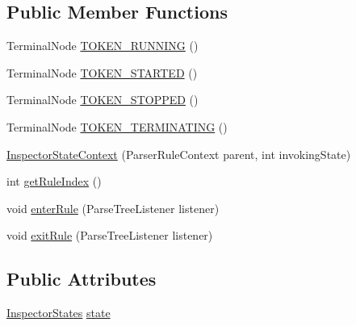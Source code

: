 \subsection*{Public Member Functions}
\begin{DoxyCompactItemize}
\item 
Terminal\+Node \hyperlink{classgov_1_1nasa_1_1jpf_1_1inspector_1_1client_1_1parser_1_1_console_grammar_parser_1_1_inspector_state_context_a774f8764930af92f61e953f03a23f813}{T\+O\+K\+E\+N\+\_\+\+R\+U\+N\+N\+I\+NG} ()
\item 
Terminal\+Node \hyperlink{classgov_1_1nasa_1_1jpf_1_1inspector_1_1client_1_1parser_1_1_console_grammar_parser_1_1_inspector_state_context_a08e5500b8b2de6c3a5b177372ccc21d6}{T\+O\+K\+E\+N\+\_\+\+S\+T\+A\+R\+T\+ED} ()
\item 
Terminal\+Node \hyperlink{classgov_1_1nasa_1_1jpf_1_1inspector_1_1client_1_1parser_1_1_console_grammar_parser_1_1_inspector_state_context_a4dc40ec3516cd961aea2c7c664465122}{T\+O\+K\+E\+N\+\_\+\+S\+T\+O\+P\+P\+ED} ()
\item 
Terminal\+Node \hyperlink{classgov_1_1nasa_1_1jpf_1_1inspector_1_1client_1_1parser_1_1_console_grammar_parser_1_1_inspector_state_context_aa4aff43344e3007f88b2b321170bb845}{T\+O\+K\+E\+N\+\_\+\+T\+E\+R\+M\+I\+N\+A\+T\+I\+NG} ()
\item 
\hyperlink{classgov_1_1nasa_1_1jpf_1_1inspector_1_1client_1_1parser_1_1_console_grammar_parser_1_1_inspector_state_context_acce407b4dab4b02991b8f60d7d9fcb0f}{Inspector\+State\+Context} (Parser\+Rule\+Context parent, int invoking\+State)
\item 
int \hyperlink{classgov_1_1nasa_1_1jpf_1_1inspector_1_1client_1_1parser_1_1_console_grammar_parser_1_1_inspector_state_context_a89d9c9d0c0266364c6ea2e2388a5a160}{get\+Rule\+Index} ()
\item 
void \hyperlink{classgov_1_1nasa_1_1jpf_1_1inspector_1_1client_1_1parser_1_1_console_grammar_parser_1_1_inspector_state_context_a19f0c67ef7c5a61206f2e9d53510dc36}{enter\+Rule} (Parse\+Tree\+Listener listener)
\item 
void \hyperlink{classgov_1_1nasa_1_1jpf_1_1inspector_1_1client_1_1parser_1_1_console_grammar_parser_1_1_inspector_state_context_a0491338eacb3fd2fe976e421862c0738}{exit\+Rule} (Parse\+Tree\+Listener listener)
\end{DoxyCompactItemize}
\subsection*{Public Attributes}
\begin{DoxyCompactItemize}
\item 
\hyperlink{enumgov_1_1nasa_1_1jpf_1_1inspector_1_1interfaces_1_1_commands_interface_1_1_inspector_states}{Inspector\+States} \hyperlink{classgov_1_1nasa_1_1jpf_1_1inspector_1_1client_1_1parser_1_1_console_grammar_parser_1_1_inspector_state_context_a29b2111ea03c558aee71e2f2e6ee6369}{state}
\end{DoxyCompactItemize}


